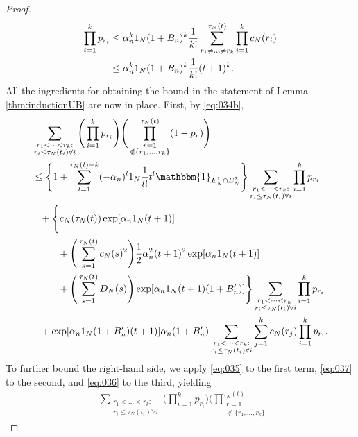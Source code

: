 \documentclass[12pt,authoryear]{article}
\theoremstyle{definition}
\newcommand{\1}[1]{\mathbbm{1}_{#1}}
\newcommand{\ON}{1_N}
\begin{document}
\begin{proof}
\begin{align}
        \prod_{i=1}^k p_{r_i}
&\leq \alpha_n^k \ON (1 + B_n)^k \frac{1}{k!}
        \sum_{r_1 \neq \dots\neq r_k}^{\tau_N(t)} 
        \prod_{i=1}^k c_N(r_i) \notag\\
&\leq \alpha_n^k \ON (1 + B_n)^k \frac{1}{k!} (t+1)^k. 
        \label{eq:037}
\end{align}
All the ingredients for obtaining the bound in the statement of Lemma \ref{thm:inductionUB} are now in place.
First, by \eqref{eq:034b},
\begin{align*}
&\sum_{\substack{r_1 <\dots< r_k :\\ r_i \leq \tau_N(t_i) \forall i}}
        \Bigg( \prod_{i=1}^k p_{r_i} \Bigg)
        \Bigg( \prod_{\substack{r=1 \\ \notin \{r_1,\dots,r_k\} }}^{\tau_N(t)} 
        (1-p_r) \Bigg) \\
&\leq \Bigg\{ 1+ \sum_{l=1}^{\tau_N(t) -k} (-\alpha_n)^l \ON 
        \frac{1}{l!} t^l \1{E_N^1 \cap E_N^2} \Bigg\}
        \sum_{\substack{r_1 <\dots< r_k :\\ r_i \leq \tau_N(t_i) \forall i}}
        \prod_{i=1}^k p_{r_i} \\
    &\phantom{\leq} + \Bigg\{ c_N(\tau_N(t)) 
        \exp[ \alpha_n \ON (t+1) ] \\
    &\phantom{\leq + \Bigg\{} + \Bigg( \sum_{s=1}^{\tau_N(t)} c_N(s)^2 \Bigg)
        \frac{1}{2} \alpha_n^2 (t+1)^2 \exp[ \alpha_n \ON (t+1) ] \\
    &\phantom{\leq + \Bigg\{} + \Bigg( \sum_{s=1}^{\tau_N(t)} D_N(s) \Bigg)
        \exp[ \alpha_n \ON (t+1) (1+B_n^\prime) ] \Bigg\}
        \sum_{\substack{r_1 <\dots< r_k :\\ r_i \leq \tau_N(t_i) \forall i}}
        \prod_{i=1}^k p_{r_i} \\
    &\phantom{\leq} + \exp[ \alpha_n \ON (1 + B_n^\prime) (t+1) ]
        \alpha_n (1 + B_n^\prime)
        \sum_{\substack{r_1 <\dots< r_k :\\ r_i \leq \tau_N(t_i) \forall i}}
        \sum_{j=1}^k c_N(r_j)
        \prod_{i=1}^k p_{r_i} .
\end{align*}
To further bound the right-hand side, we apply \eqref{eq:035} to the first term, \eqref{eq:037} to the second, and \eqref{eq:036} to the third, yielding
\begin{align*}
&\sum_{\substack{r_1 <\dots< r_k :\\ r_i \leq \tau_N(t_i) \forall i}}
        \Bigg( \prod_{i=1}^k p_{r_i} \Bigg)
        \Bigg( \prod_{\substack{r=1 \\ \notin \{r_1,\dots,r_k\} }}^{\tau_N(t)} 

\end{align*}
\end{proof}
\end{document}
